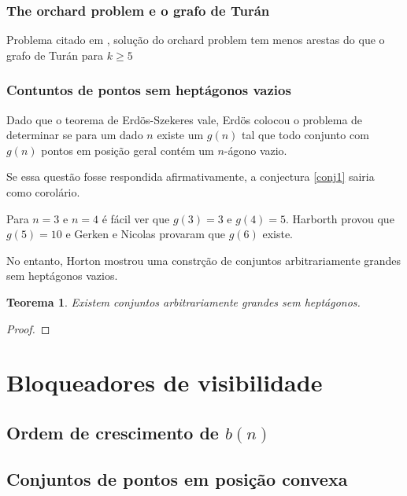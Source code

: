 \documentclass[a4paper]{book}
\newtheorem{teorema}{Teorema}[section]
\begin{document}
\subsection{The orchard problem e o grafo de Turán}
Problema citado em \cite{visblock}, solução do orchard problem tem menos arestas do que o grafo de Turán para $k\geq 5$

\subsection{Contuntos de pontos sem heptágonos vazios}
Dado que o teorema de Erdös-Szekeres vale, Erdös colocou o problema de determinar se para um dado $n$ existe um $g(n)$ tal que todo conjunto com $g(n)$ pontos em posição geral contém um $n$-ágono vazio.

Se essa questão fosse respondida afirmativamente, a conjectura \ref{conj1} sairia como corolário.

Para $n=3$ e $n=4$ é fácil ver que $g(3)=3$ e $g(4)=5$. Harborth\cite{Harborth1978} provou que $g(5)=10$ e Gerken\cite{Gerken} e Nicolas\cite{Nicolas} provaram que $g(6)$ existe.

No entanto, Horton\cite{heptagon} mostrou uma constrção de conjuntos arbitrariamente grandes sem heptágonos vazios.

\begin{teorema}
Existem conjuntos arbitrariamente grandes sem heptágonos.
\end{teorema}
\begin{proof}

\end{proof}
\chapter{Bloqueadores de visibilidade}

\section{Ordem de crescimento de $b(n)$}
\cite{block,blockers}

\section{Conjuntos de pontos em posição convexa}
\cite{block,blockers}



{}
\end{document}
